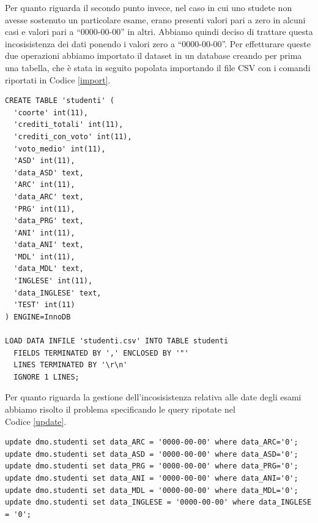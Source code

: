 \documentclass[12pt]{article}
\begin{document}
Per quanto riguarda il secondo punto invece, nel caso in cui uno stu\-dete non avesse sostenuto un particolare esame, erano presenti valori pari a zero in alcuni casi e valori pari a ``0000-00-00'' in altri.
Abbiamo quindi deciso di trattare questa incosisistenza dei dati ponendo i valori zero a ``0000-00-00''.
Per effetturare queste due operazioni abbiamo importato il dataset in un database creando per prima una tabella, che è stata in seguito popolata importando il file CSV con i comandi riportati in Codice \ref{import}.
\begin{lstlisting}[caption={Creazione della table}, style=sql, label={import}, captionpos=b]
CREATE TABLE 'studenti' (
  'coorte' int(11),
  'crediti_totali' int(11),
  'crediti_con_voto' int(11),
  'voto_medio' int(11),
  'ASD' int(11),
  'data_ASD' text,
  'ARC' int(11),
  'data_ARC' text,
  'PRG' int(11),
  'data_PRG' text,
  'ANI' int(11),
  'data_ANI' text,
  'MDL' int(11),
  'data_MDL' text,
  'INGLESE' int(11),
  'data_INGLESE' text,
  'TEST' int(11)
) ENGINE=InnoDB

LOAD DATA INFILE 'studenti.csv' INTO TABLE studenti
  FIELDS TERMINATED BY ',' ENCLOSED BY '"'
  LINES TERMINATED BY '\r\n'
  IGNORE 1 LINES;
\end{lstlisting}
Per quanto riguarda la gestione dell'incosisistenza relativa alle date degli esami abbiamo risolto il problema specificando le query ripotate nel \\Codice \ref{update}.
\begin{lstlisting}[caption={Update della tabella},style=sql, label={update},captionpos=b]
update dmo.studenti set data_ARC = '0000-00-00' where data_ARC='0'; 
update dmo.studenti set data_ASD = '0000-00-00' where data_ASD='0'; 
update dmo.studenti set data_PRG = '0000-00-00' where data_PRG='0'; 
update dmo.studenti set data_ANI = '0000-00-00' where data_ANI='0'; 
update dmo.studenti set data_MDL = '0000-00-00' where data_MDL='0';
update dmo.studenti set data_INGLESE = '0000-00-00' where data_INGLESE = '0';
\end{lstlisting}
\newpage
\end{document}
